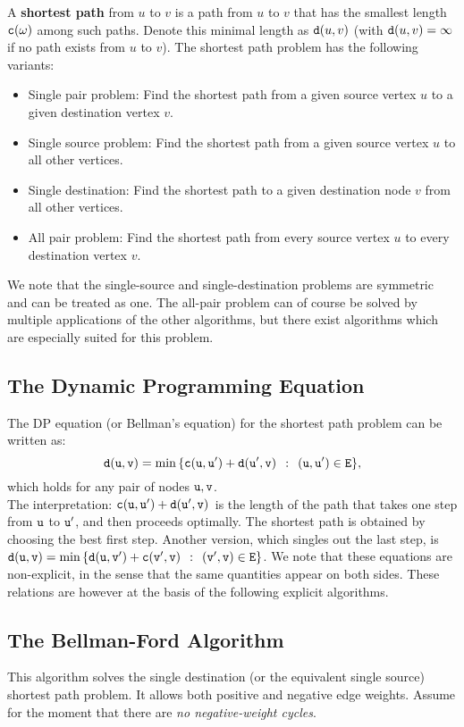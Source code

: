 A \textbf{shortest path} from $u$ to $v$ is a path from $u$ to $v$ that has the smallest length  ${\tt c}({\tt \omega})$ among such paths. Denote this minimal length as ${\tt d}(u,v)$ (with ${\tt d}(u,v) = \infty $ if no path exists from $u$ to $v$).
The shortest path problem has the following variants:
\begin{itemize}
  \item Single pair problem:  Find the shortest path from a given source vertex $u$ to a given destination vertex $v$.
  \item Single source problem: Find the shortest path from a given source vertex $u$ to all other vertices.
  \item Single destination: Find the shortest path to a given destination node $v$ from all other vertices.
  \item All pair problem: Find the shortest path from every source vertex $u$ to every destination vertex $v$.
\end{itemize}

We note that the single-source and single-destination problems are symmetric and can be treated as one.  The all-pair problem can of course be solved by multiple applications of the other algorithms, but there exist algorithms which are especially suited for this problem.

\subsection{The Dynamic Programming Equation}
The DP equation (or Bellman's equation) for the shortest path problem can be written as:
\[{\tt d}({\tt u},{\tt v}) = \min \,\{ {\tt c}({\tt u},{\tt u}') + {\tt d}({\tt u}',{\tt v})\,\;:\,\;({\tt u},{\tt u}') \in {\tt E}\}, \]
which holds for any pair of nodes ${\tt u},{\tt v}$.
\\
The interpretation: ${\tt c}({\tt u},{\tt u}') + {\tt d}({\tt u}',{\tt v})\,\;$is the length of the path that takes one step from ${\tt u}$ to ${\tt u}'$, and then proceeds optimally. The shortest path is obtained by choosing the best first step.
Another version, which singles out the last step, is
${\tt d}({\tt u},{\tt v}) = \min \,\{ {\tt d}({\tt u},{\tt v}') + {\tt c}({\tt v}',{\tt v})\,\;:\,\;({\tt v}',{\tt v}) \in {\tt E}\} $.
We note that these equations are non-explicit, in the sense that the same quantities appear on both sides.  These relations are however at the basis of the following explicit algorithms.

\subsection{The Bellman-Ford Algorithm}
This algorithm solves the single destination (or the equivalent single source) shortest path problem. It allows both positive and negative edge weights. Assume for the moment that there are \emph{no negative-weight cycles}.

